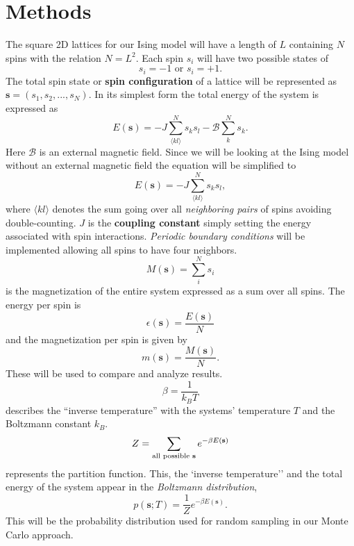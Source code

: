 \documentclass[english,notitlepage,reprint,nofootinbib]{revtex4-1}  %
\begin{document}
\section{Methods}\label{sec:methods}
The square 2D lattices for our Ising model will have a length of $L$ containing $N$ spins with the relation $N = L^2$. Each spin $s_i$ will have two possible states of 
\begin{equation*}
    s_i = -1 \text{ or } s_i = +1.
\end{equation*}
The total spin state or \textbf{spin configuration} of a lattice will be represented as $\textbf{s} = (s_1, s_2, ..., s_N)$. In its simplest form the total energy of the system is expressed as
\begin{equation*}
    E(\textbf{s}) = - J \sum^N_{\langle kl \rangle} s_k s_l - \mathscr{B} \sum^N_{k} s_k.
\end{equation*}
Here $\mathscr{B}$ is an external magnetic field. Since we will be looking at the Ising model without an external magnetic field the equation will be simplified to
\begin{equation}
    E(\textbf{s}) = - J \sum^N_{\langle kl \rangle} s_k s_l,
\end{equation}
where $\langle kl \rangle$ denotes the sum going over all \textit{neighboring pairs} of spins avoiding double-counting. $J$ is the \textbf{coupling constant} simply setting the energy associated with spin interactions. \textit{Periodic boundary conditions} will be implemented allowing all spins to have four neighbors.
\begin{equation}
    M(\textbf{s}) = \sum^N_i s_i
\end{equation}
is the magnetization of the entire system expressed as a sum over all spins. The energy per spin is
\begin{equation}
    \epsilon(\textbf{s}) = \frac{E(\textbf{s})}{N} \label{eq:mean_E}
\end{equation}
and the magnetization per spin is given by
\begin{equation}
    m(\textbf{s}) = \frac{M(\textbf{s})}{N}. \label{eq:mean_M}
\end{equation}
These will be used to compare and analyze results.
\begin{equation}
    \beta = \frac{1}{k_B T}
\end{equation}
describes the ``inverse temperature'' with the systems' temperature $T$ and the Boltzmann constant $k_B$.
\begin{equation}
    Z = \sum_{\text{all possible \textbf{s}}} e^{- \beta E(\textbf{s})}
\end{equation}
represents the partition function. This, the `inverse temperature'' and the total energy of the system appear in the \textit{Boltzmann distribution},
\begin{equation}
    p(\textbf{s};T) = \frac{1}{Z} e^{-\beta E(\textbf{s})}. \label{eq:prob_dist}
\end{equation}
This will be the probability distribution used for random sampling in our Monte Carlo approach. 
\end{document}
